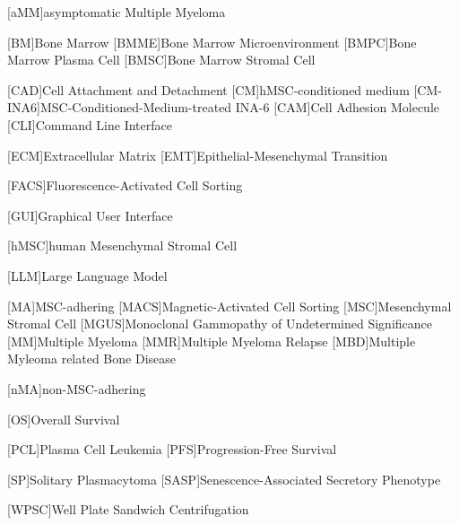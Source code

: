 
%
\label{sec:Abbreviations}%
{%
    \small%
    \begin{spacing}{.0}%
        \begin{acronym}%
            [aMM]{asymptomatic Multiple Myeloma}

            [BM]{Bone Marrow}
            [BMME]{Bone Marrow Microenvironment}
            [BMPC]{Bone Marrow Plasma Cell}
            [BMSC]{Bone Marrow Stromal Cell}

            [CAD]{Cell Attachment and Detachment}
            [CM]{hMSC-conditioned medium}
            [CM-INA6]{MSC-Conditioned-Medium-treated INA-6}
            [CAM]{Cell Adhesion Molecule}
            [CLI]{Command Line Interface}

            [ECM]{Extracellular Matrix}
            [EMT]{Epithelial-Mesenchymal Transition}
            
            [FACS]{Fluorescence-Activated Cell Sorting}
            
            [GUI]{Graphical User Interface}
            
            [hMSC]{human Mesenchymal Stromal Cell}

            [LLM]{Large Language Model}
            
            [MA]{MSC-adhering}
            [MACS]{Magnetic-Activated Cell Sorting}
            [MSC]{Mesenchymal Stromal Cell}
            [MGUS]{Monoclonal Gammopathy of Undetermined Significance}
            [MM]{Multiple Myeloma}
            [MMR]{Multiple Myeloma Relapse}
            [MBD]{Multiple Myleoma related Bone Disease}

            [nMA]{non-MSC-adhering}
            
            [OS]{Overall Survival}

            [PCL]{Plasma Cell Leukemia}
            [PFS]{Progression-Free Survival}

            [SP]{Solitary Plasmacytoma}
            [SASP]{Senescence-Associated Secretory Phenotype} %
            
            [WPSC]{Well Plate Sandwich Centrifugation}


        \end{acronym}
    \end{spacing}
}